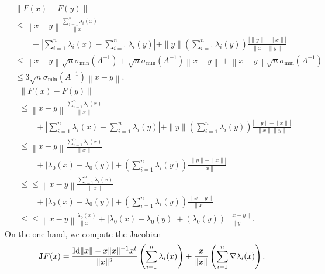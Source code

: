\documentclass[10pt,a4paper]{article}
\begin{document}
    \begin{align}
        &
        \left\| F(x) - F(y) \right\|
        \\&
        \leq
        \left\| x - y \right\|
        \frac{\sum_{i=1}^{n} \lambda_{i}(x)}{\|x\|}
        \\&\qquad 
        +
        \left| \sum_{i=1}^{n} \lambda_{i}(x) - \sum_{i=1}^{n} \lambda_{i}(y) \right|
        +
        \|y\| \left( \sum_{i=1}^{n} \lambda_{i}(y) \right)
        \frac{ \left| \|y\| - \|x\| \right| }{\|x\| \|y\|}
        \\&\leq
        \left\| x - y \right\|
        \sqrt{n} \sigma_{\min}(A^{-1})
        +
        \sqrt{n} \sigma_{\min}(A^{-1}) \left\| x - y \right\|
        +
        \left\| x - y \right\|
        \sqrt{n} \sigma_{\min}(A^{-1})
        \\&\leq
        3\sqrt{n} \sigma_{\min}(A^{-1})
        \left\| x - y \right\|
        .    
    \end{align}
    \begin{align}
        &
        \left\| F(x) - F(y) \right\|
        \\&
        \leq
        \left\| x - y \right\|
        \frac{\sum_{i=1}^{n} \lambda_{i}(x)}{\|x\|}
        \\&\qquad 
        +
        \left| \sum_{i=1}^{n} \lambda_{i}(x) - \sum_{i=1}^{n} \lambda_{i}(y) \right|
        +
        \|y\| \left( \sum_{i=1}^{n} \lambda_{i}(y) \right)
        \frac{ \left| \|y\| - \|x\| \right| }{\|x\| \|y\|}
        \\&
        \leq
        \left\| x - y \right\|
        \frac{\sum_{i=1}^{n} \lambda_{i}(x)}{\|x\|}
        \\&\qquad 
        +
        \left| \lambda_{0}(x) - \lambda_{0}(y) \right|
        +
        \left( \sum_{i=1}^{n} \lambda_{i}(y) \right)
        \frac{ \left| \|y\| - \|x\| \right| }{\|x\|}
        \\&\leq
        \leq
        \left\| x - y \right\|
        \frac{\sum_{i=1}^{n} \lambda_{i}(x)}{\|x\|}
        \\&\qquad 
        +
        \left| \lambda_{0}(x) - \lambda_{0}(y) \right|
        +
        \left( \sum_{i=1}^{n} \lambda_{i}(y) \right)
        \frac{ \| x - y \| }{\|x\|}
        \\&\leq
        \leq
        \left\| x - y \right\|
        \frac{ \lambda_{0}(x) }{\|x\|}
        +
        \left| \lambda_{0}(x) - \lambda_{0}(y) \right|
        +
        \left( \lambda_{0}(y) \right)
        \frac{ \| x - y \| }{\|y\|}
        .    
    \end{align}
    On the one hand,
    we compute the Jacobian  
    \begin{align}
        {\mathbf{J}} F(x) 
        = 
        \frac{ {\rm Id} \|x\| - x \|x\|^{-1} x^t }{\|x\|^2} 
        \left( \sum_{i=1}^{n} \lambda_{i}(x) \right)
        + 
        \frac{x}{\|x\|} \left( \sum_{i=1}^{n} \nabla\lambda_{i}(x) \right)
        .
    \end{align}
    
\end{document}
